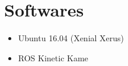 \chapter{Softwares}
 
\begin{itemize}
\item Ubuntu 16.04 (Xenial Xerus)
\item ROS Kinetic Kame

\end{itemize}